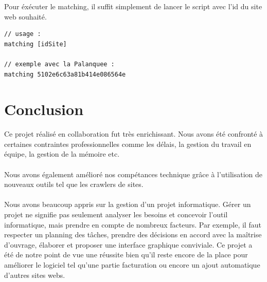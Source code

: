 \documentclass{report}
\begin{document}
Pour éxécuter le matching, il suffit simplement de lancer le script avec l'id du site web souhaité.
\begin{lstlisting}
// usage :
matching [idSite]

// exemple avec la Palanquee :
matching 5102e6c63a81b414e086564e
\end{lstlisting}

\chapter{Conclusion}
Ce projet réalisé en collaboration fut très enrichissant. Nous avons été confronté à certaines contraintes professionnelles comme les délais, la gestion du travail en équipe, la gestion de la mémoire etc.\\\\
Nous avons également amélioré nos compétances technique grâce à l'utilisation de nouveaux outils tel que les crawlers de sites.\\\\
Nous avons beaucoup appris sur la gestion d’un projet informatique. Gérer un projet ne signifie pas seulement analyser les besoins et concevoir l’outil informatique, mais prendre en compte de nombreux facteurs. Par exemple, il faut respecter un planning des tâches, prendre des décisions en accord avec la maîtrise d’ouvrage, élaborer et proposer une interface graphique conviviale. Ce projet a été de notre point de vue une réussite bien qu'il reste encore de la place pour améliorer le logiciel tel qu'une partie facturation ou encore un ajout automatique d'autres sites webs.
\end{document}
